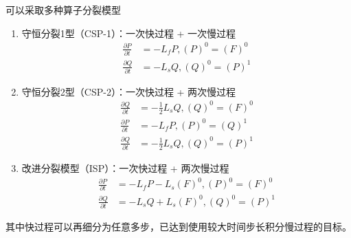 \documentclass{ctexart}
\begin{document}
可以采取多种算子分裂模型
\begin{enumerate}
\item 守恒分裂1型（CSP-1）：一次快过程 + 一次慢过程
\begin{align}
  \frac{\partial P}{\partial t} & = - L_f P, (P)^0 = (F)^0 \\
  \frac{\partial Q}{\partial t} & = - L_s Q, (Q)^0 = (P)^1
\end{align}
\item 守恒分裂2型（CSP-2）：一次快过程 + 两次慢过程
\begin{align}
  \frac{\partial Q}{\partial t} & = - \frac{1}{2} L_s Q, (Q)^0 = (F)^0 \\
  \frac{\partial P}{\partial t} & = - L_f P, (P)^0 = (Q)^1 \\
  \frac{\partial Q}{\partial t} & = - \frac{1}{2} L_s Q, (Q)^0 = (P)^1
\end{align}
\item 改进分裂模型（ISP）：一次快过程 + 两次慢过程
\begin{align}
  \frac{\partial P}{\partial t} & = - L_f P - L_s (F)^0, (P)^0 = (F)^0 \\
  \frac{\partial Q}{\partial t} & = - L_s Q + L_s (F)^0, (Q)^0 = (P)^1
\end{align}
\end{enumerate}
其中快过程可以再细分为任意多步，已达到使用较大时间步长积分慢过程的目标。
\end{document}
